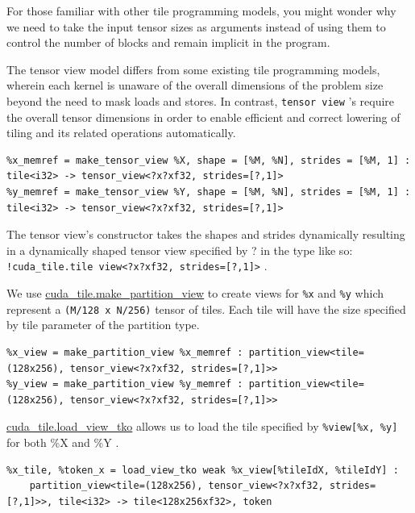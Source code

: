 \documentclass{article}
\begin{document}
For those familiar with other tile programming models, you might wonder why we need to take the input tensor sizes as arguments instead of using them to control the number of blocks and remain implicit in the program.


The tensor view model differs from some existing tile programming models, wherein each kernel is unaware of the overall dimensions of the problem size beyond the need to mask loads and stores. In contrast, \texttt{tensor view} 's require the overall tensor dimensions in order to enable efficient and correct lowering of tiling and its related operations automatically.


\begin{lstlisting}
%x_memref = make_tensor_view %X, shape = [%M, %N], strides = [%M, 1] : tile<i32> -> tensor_view<?x?xf32, strides=[?,1]>
%y_memref = make_tensor_view %Y, shape = [%M, %N], strides = [%M, 1] : tile<i32> -> tensor_view<?x?xf32, strides=[?,1]>
\end{lstlisting}

The tensor view's constructor takes the shapes and strides dynamically resulting in a dynamically shaped tensor view specified by ? in the type like so: \texttt{!cuda\_tile.tile view<?x?xf32, strides=[?,1]>} .


We use \href{https://docs.nvidia.com/cuda/tile-ir/latest/sections/operations.html#op-cuda-tile-make-partition-view}{cuda\_tile.make\_partition\_view} to create views for \texttt{\%x} and \texttt{\%y} which represent a \texttt{(M/128 x N/256)} tensor of tiles. Each tile will have the size specified by tile parameter of the partition type.


\begin{lstlisting}
%x_view = make_partition_view %x_memref : partition_view<tile=(128x256), tensor_view<?x?xf32, strides=[?,1]>>
%y_view = make_partition_view %y_memref : partition_view<tile=(128x256), tensor_view<?x?xf32, strides=[?,1]>>
\end{lstlisting}

\href{https://docs.nvidia.com/cuda/tile-ir/latest/sections/operations.html#op-cuda-tile-load-view-tko}{cuda\_tile.load\_view\_tko} allows us to load the tile specified by \texttt{\%view[\%x, \%y]} for both \%X and \%Y .


\begin{lstlisting}
%x_tile, %token_x = load_view_tko weak %x_view[%tileIdX, %tileIdY] :
    partition_view<tile=(128x256), tensor_view<?x?xf32, strides=[?,1]>>, tile<i32> -> tile<128x256xf32>, token
\end{lstlisting}
\end{document}

